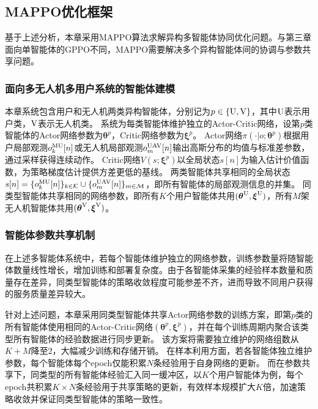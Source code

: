 \subsection{MAPPO优化框架}
基于上述分析，本章采用MAPPO算法\supercite{Yu_2022_NeurIPS_MAPPO}求解异构多智能体协同优化问题。与第三章面向单智能体的GPPO不同，MAPPO需要解决多个异构智能体间的协调与参数共享问题。

\subsubsection{面向多无人机多用户系统的智能体建模}

本章系统包含用户和无人机两类异构智能体，分别记为$p\in\{{\rm U},{\rm V}\}$，其中${\rm U}$表示用户类，${\rm V}$表示无人机类。
系统为每类智能体维护独立的Actor-Critic网络，设第$p$类智能体的Actor网络参数为$\boldsymbol{\theta}^p$，Critic网络参数为$\boldsymbol{\xi}^p$。
Actor网络$\pi(\cdot|o;\boldsymbol{\theta}^p)$根据用户局部观测$o_k^{\rm MU}[n]$或无人机局部观测$o_m^{\rm UAV}[n]$输出高斯分布的均值与标准差参数，通过采样获得连续动作。
Critic网络$V(s;\boldsymbol{\xi}^p)$以全局状态$s[n]$为输入估计价值函数，为策略梯度估计提供方差更低的基线。
两类智能体共享相同的全局状态$s[n] = \{o_k^{\rm MU}[n]\}_{k\in\mathcal{K}} \cup \{o_m^{\rm UAV}[n]\}_{m\in\mathcal{M}}$，即所有智能体的局部观测信息的并集。
同类型智能体共享相同的网络参数，即所有$K$个用户智能体共用$(\boldsymbol{\theta}^{\rm U}, \boldsymbol{\xi}^{\rm U})$，所有$M$架无人机智能体共用$(\boldsymbol{\theta}^{\rm V}, \boldsymbol{\xi}^{\rm V})$。

\subsubsection{智能体参数共享机制}

在上述多智能体系统中，若每个智能体维护独立的网络参数，训练参数量将随智能体数量线性增长，增加训练和部署复杂度。由于各智能体采集的经验样本数量和质量存在差异，同类型智能体的策略收敛程度可能参差不齐，进而导致不同用户获得的服务质量差异较大。

针对上述问题，本章采用同类型智能体共享Actor网络参数的训练方案，即第$p$类的所有智能体使用相同的Actor-Critic网络$(\boldsymbol{\theta}^p, \boldsymbol{\xi}^p)$，并在每个训练周期内聚合该类型所有智能体的经验数据进行同步更新。
该方案将需要独立维护的网络组数从$K+M$降至$2$，大幅减少训练和存储开销。
在样本利用方面，若各智能体独立维护参数，每个智能体每个epoch仅能积累$N$条经验用于自身网络的更新。
而在参数共享下，同类型的所有智能体经验汇入同一缓冲区，以$K$个用户智能体为例，每个epoch共积累$K \times N$条经验用于共享策略的更新，有效样本规模扩大$K$倍，加速策略收敛并保证同类型智能体的策略一致性。

